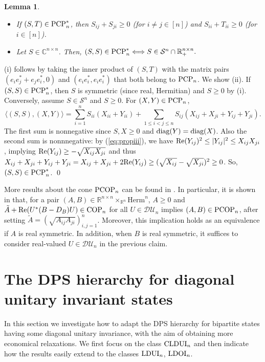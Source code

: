 \documentclass[11pt]{article}
\makeatletter
\newcommand{\R}{\ensuremath{\mathbb{R}}}   %
\newcommand{\C}{\ensuremath{\mathbb{C}}} %
\newcommand{\MS}{{\mathcal S}}
\newcommand{\MDU}{{\mathcal {DU}}}
\newcommand{\Herm}{\mathrm{Herm}}
\newcommand{\PCP}{\text{\rm PCP}}
\newcommand{\COP}{\text{\rm COP}}
\newcommand{\CLDUI}{\text{\rm CLDUI}}
\newcommand{\LDUI}{\text{\rm LDUI}}
\newcommand{\LDOI}{\text{\rm LDOI}}
\newcommand{\DPSt}{\mathrm{DPS}^{(t)}}
\newcommand{\PCOP}{\text{\rm PCOP}}
\newcommand{\diag}{\text{\rm diag}}
\newcommand{\Rea}{\text{\rm Re}}
\theoremstyle{plain}
\newtheorem{lemma}[satz]{Lemma}
\renewenvironment{proof}[1][\proofname]{%
  \par
  \pushQED{}%
  \normalfont
  \topsep6\p@\@plus6\p@
  \trivlist
  \item[\hskip\labelsep\itshape #1\@addpunct{.}]%
}{%
  \popQED
  \endtrivlist
}
\newcommand{\ML}{\textcolor{blue}}
\makeatother
\begin{document}
\begin{lemma}\label{lem:PCP-dual-diag}
\begin{itemize}
\item[(i)] If $(S,T)\in \PCP_n^*$, then $S_{ij}+S_{ji}\ge 0$  (for $i\ne j\in [n]$) and $S_{ii}+T_{ii}\ge 0$ (for $i\in [n]$).
\item[(ii)] Let $S\in \C^{n\times n}$. Then,  
 $(S,S)\in \PCP_n^*\Longleftrightarrow S\in  \MS^n\cap \R^{n\times n}_+.$
 \end{itemize}
\end{lemma}
\begin{proof}
(i) follows by taking the inner product of $(S,T)$ with the matrix pairs $(e_ie_j^*+e_je_i^*,0)$ and $(e_ie_i^*,e_ie_i^*)$ that both belong to $\PCP_n$. 
We show (ii). If $(S,S)\in \PCP_n^*$, then $S$ is symmetric (since real, Hermitian) and   $S\ge 0$ by (i). Conversely, assume $S\in\MS^n$ and $S\ge 0$. For $(X,Y)\in\PCP_n$,  
$$\langle (S,S),(X,Y)\rangle =\sum_{i=1}^n S_{ii}(X_{ii}+Y_{ii}) + \sum_{1\le i<j\le n}S_{ij}(X_{ij}+X_{ji}+Y_{ij}+Y_{ji}).$$
The first sum is nonnegative since $S,X\ge 0$ and $\diag(Y)=\diag(X)$. Also the second sum is nonnnegative:  by (\ref{eq:propiii}), we have 
$\Rea(Y_{ij})^2\le |Y_{ij}|^2 \le X_{ij}X_{ji}$, implying $\Rea(Y_{ij}) \ge -\sqrt{X_{ij}X_{ji}}$ and thus 
$X_{ij}+X_{ji}+Y_{ij}+Y_{ji}= X_{ij}+X_{ji}+2 \Rea(Y_{ij}) \ge (\sqrt{X_{ij}}-\sqrt{X_{ji}})^2 \ge 0$. So, $(S,S)\in\PCP_n^*$.
\qed\end{proof}

More results about the cone $\PCOP_n$ can be found in \cite{GNP_2025}. In particular, it is shown in \cite[Theorem 3.9, Corollary 3.10]{GNP_2025} that, for a pair $(A,B)\in \R^{n\times n}\times_{\R^n}\Herm^n$, $A\ge 0$ and $\tilde A+ \Rea (U^*(B-D_B)U)\in\COP_n$ for all $U\in\MDU_n$ implies  $(A,B)\in \PCOP_n$, after setting $\tilde A=(\sqrt{A_{ij}A_{ji}})_{i,j=1}^n$. Moreover, this implication holds as an equivalence if $A$ is real symmetric. In addition, when $B$ is real symmetric, it suffices to consider real-valued $U\in \MDU_n$ in the previous claim.

\section{The DPS hierarchy for diagonal unitary invariant states %
}\label{sec:DPS-CLDUI}

In this section we investigate how to adapt the DPS hierarchy for  bipartite states having some diagonal unitary invariance, with the aim of obtaining more economical relaxations. 
We   first focus on the class  $\CLDUI_n$ and then indicate how the results easily extend  to the classes $\LDUI_n$, $\LDOI_n$.
\end{document}

